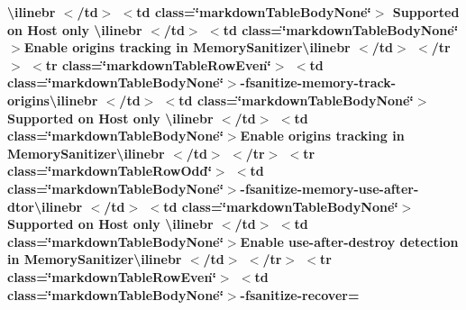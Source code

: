 \begin{longtabu}
{\bfseries{{\ttfamily \textbackslash{}ilinebr \texorpdfstring{$<$}{<}/td\texorpdfstring{$>$}{>} \texorpdfstring{$<$}{<}td class=\char`\"{}markdown\+Table\+Body\+None\char`\"{}\texorpdfstring{$>$}{>} Supported on Host only \textbackslash{}ilinebr \texorpdfstring{$<$}{<}/td\texorpdfstring{$>$}{>} \texorpdfstring{$<$}{<}td class=\char`\"{}markdown\+Table\+Body\+None\char`\"{}\texorpdfstring{$>$}{>}}Enable origins tracking in Memory\+Sanitizer{\ttfamily \textbackslash{}ilinebr \texorpdfstring{$<$}{<}/td\texorpdfstring{$>$}{>} \texorpdfstring{$<$}{<}/tr\texorpdfstring{$>$}{>} \texorpdfstring{$<$}{<}tr class=\char`\"{}markdown\+Table\+Row\+Even\char`\"{}\texorpdfstring{$>$}{>} \texorpdfstring{$<$}{<}td class=\char`\"{}markdown\+Table\+Body\+None\char`\"{}\texorpdfstring{$>$}{>}}-\/fsanitize-\/memory-\/track-\/origins{\ttfamily \textbackslash{}ilinebr \texorpdfstring{$<$}{<}/td\texorpdfstring{$>$}{>} \texorpdfstring{$<$}{<}td class=\char`\"{}markdown\+Table\+Body\+None\char`\"{}\texorpdfstring{$>$}{>} Supported on Host only \textbackslash{}ilinebr \texorpdfstring{$<$}{<}/td\texorpdfstring{$>$}{>} \texorpdfstring{$<$}{<}td class=\char`\"{}markdown\+Table\+Body\+None\char`\"{}\texorpdfstring{$>$}{>}}Enable origins tracking in Memory\+Sanitizer{\ttfamily \textbackslash{}ilinebr \texorpdfstring{$<$}{<}/td\texorpdfstring{$>$}{>} \texorpdfstring{$<$}{<}/tr\texorpdfstring{$>$}{>} \texorpdfstring{$<$}{<}tr class=\char`\"{}markdown\+Table\+Row\+Odd\char`\"{}\texorpdfstring{$>$}{>} \texorpdfstring{$<$}{<}td class=\char`\"{}markdown\+Table\+Body\+None\char`\"{}\texorpdfstring{$>$}{>}}-\/fsanitize-\/memory-\/use-\/after-\/dtor{\ttfamily \textbackslash{}ilinebr \texorpdfstring{$<$}{<}/td\texorpdfstring{$>$}{>} \texorpdfstring{$<$}{<}td class=\char`\"{}markdown\+Table\+Body\+None\char`\"{}\texorpdfstring{$>$}{>} Supported on Host only \textbackslash{}ilinebr \texorpdfstring{$<$}{<}/td\texorpdfstring{$>$}{>} \texorpdfstring{$<$}{<}td class=\char`\"{}markdown\+Table\+Body\+None\char`\"{}\texorpdfstring{$>$}{>}}Enable use-\/after-\/destroy detection in Memory\+Sanitizer{\ttfamily \textbackslash{}ilinebr \texorpdfstring{$<$}{<}/td\texorpdfstring{$>$}{>} \texorpdfstring{$<$}{<}/tr\texorpdfstring{$>$}{>} \texorpdfstring{$<$}{<}tr class=\char`\"{}markdown\+Table\+Row\+Even\char`\"{}\texorpdfstring{$>$}{>} \texorpdfstring{$<$}{<}td class=\char`\"{}markdown\+Table\+Body\+None\char`\"{}\texorpdfstring{$>$}{>}}-\/fsanitize-\/recover=}}


\end{longtabu}
